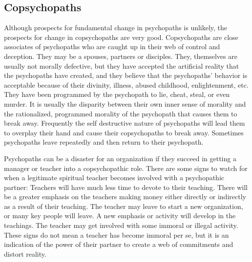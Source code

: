 \documentclass[a5paper,10pt,english]{book}
\begin{document}
\subsection{Co\sphinxhyphen{}psychopaths}
\label{\detokenize{psychopaths:co-psychopaths}}
\sphinxAtStartPar
Although prospects for fundamental change in psychopaths is unlikely,
the prospects for change in co\sphinxhyphen{}psychopaths are very good. Co\sphinxhyphen{}psychopaths
are close associates of psychopaths who are caught up in their web of
control and deception. They may be a spouses, partners or disciples.
They, themselves are usually not morally defective, but they have
accepted the artificial reality that the psychopaths have created, and
they believe that the psychopaths’ behavior is acceptable because of
their divinity, illness, abused childhood, enlightenment, etc. They have
been programmed by the psychopath to lie, cheat, steal, or even murder.
It is usually the disparity between their own inner sense of morality
and the rationalized, programmed morality of the psychopath that causes
them to break away. Frequently the self destructive nature of
psychopaths will lead them to overplay their hand and cause their
co\sphinxhyphen{}psychopaths to break away. Sometimes \sphinxhyphen{}psychopaths leave
repeatedly and then return to their psychopath.

\sphinxAtStartPar
Psychopaths can be a disaster for an organization if they succeed in
getting a manager or teacher into a co\sphinxhyphen{}psychopathic role. There are some
signs to watch for when a legitimate spiritual teacher becomes involved
with a psychopathic partner: Teachers will have much less time to devote
to their teaching. There will be a greater emphasis on the teachers
making money either directly or indirectly as a result of their
teaching. The teacher may leave to start a new organization, or many key
people will leave. A new emphasis or activity will develop in the
teachings. The teacher may get involved with some immoral or illegal
activity. These signs do not mean a teacher has become immoral per se,
but it is an indication of the power of their partner to create a web of
commitments and distort reality.
\end{document}
